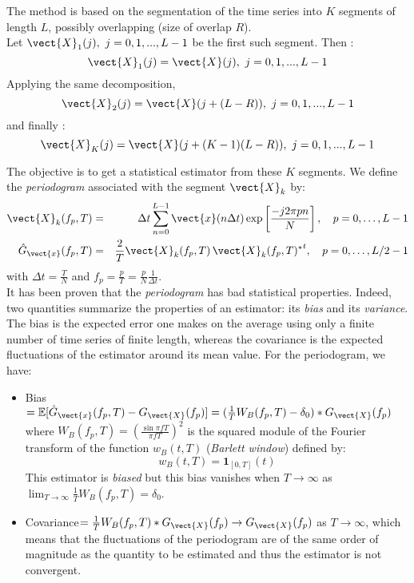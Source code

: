 The method is based on the segmentation of the time series into $K$ segments of length $L$, possibly overlapping (size of overlap $R$).\\
Let $\vect{X}_{1}(j), \ j = 0, 1,...,L-1$ be the first such segment. Then :
\begin{equation*}
  \vect{X}_{1}(j) = \vect{X}(j) , \ j = 0, 1,...,L-1
\end{equation*}
Applying the same decomposition,
\begin{equation*}
  \vect{X}_{2}(j) = \vect{X}(j + (L - R)) , \ j = 0, 1,...,L-1
\end{equation*}
and finally :
\begin{equation*}
  \vect{X}_{K}(j) = \vect{X}(j + (K-1)(L-R)) , \ j = 0, 1,...,L-1
\end{equation*}

The objective is to get a statistical estimator from these $K$ segments. We define the \emph{periodogram} associated with the segment $\vect{X}_k$ by:
\begin{eqnarray*}
  \vect{X}_{k}(f_p,T)&=&\Delta t\sum_{n=0}^{L-1}\vect{x}(n\Delta t)\exp\left[\frac{-j2\pi pn}{N}\right], \quad p=0,\dots, L-1\\
  \hat{G}_{\vect{x}}(f_p,T)&=&\frac{2}{T}\vect{X}_{k}(f_p,T)\,{\vect{X}_{k}(f_p,T)^*}^t,\quad p=0,\dots,L/2-1
\end{eqnarray*}
with $\Delta t=\frac{T}{N}$ and $f_p=\frac{p}{T}=\frac{p}{N}\frac{1}{\Delta t}$.\\

It has been proven that the \emph{periodogram} has bad statistical properties. Indeed, two quantities summarize the properties of an estimator:
its \emph{bias} and its \emph{variance}.
The bias is the expected error one makes on the average using only a finite number of time series of finite length, whereas the covariance is the expected fluctuations of
the estimator around its mean value. For the periodogram, we have:

\begin{itemize}
\item Bias$=\mathbb{E}[\hat{G}_{\vect{x}}(f_p, T)-G_{\vect{X}}(f_p)]=(\frac{1}{T}W_B(f_p, T)-\delta_0)*G_{\vect{X}}(f_p)$ where $W_B(f_p, T) = \left(\frac{\sin\pi fT}{\pi fT}\right)^2$ is the squared module of the Fourier transform of the function $w_B(t, T)$ (\emph{Barlett window}) defined by:
  \begin{equation}
    w_B(t, T) = \mathbf{1}_{[0,T]}(t)
  \end{equation}
  This estimator is \emph{biased} but this bias vanishes when $T\rightarrow\infty$ as $\lim_{T\rightarrow\infty} \frac{1}{T}W_B(f_p, T)=\delta_0$.
\item Covariance$=\frac{1}{T}W_B(f_p, T)*G_{\vect{X}}(f_p)\rightarrow G_{\vect{X}}(f_p)$ as $T\rightarrow\infty$,
  which means that the fluctuations of the periodogram are of the same order of magnitude as the quantity to be estimated and thus the estimator is not convergent.
\end{itemize}

